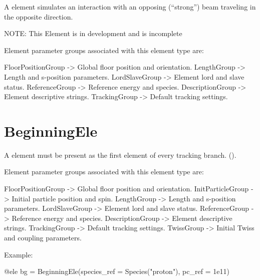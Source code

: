 A  element simulates an interaction with an opposing
(``strong'') beam traveling in the opposite direction.

NOTE: This Element is in development and is incomplete

Element parameter groups associated with this element type are:
\TOPrule
\begin{example}
  FloorPositionGroup -> Global floor position and orientation.  
  LengthGroup        -> Length and s-position parameters.  
  LordSlaveGroup     -> Element lord and slave status.  
  ReferenceGroup     -> Reference energy and species.  
  DescriptionGroup   -> Element descriptive strings.  
  TrackingGroup      -> Default tracking settings.  
\end{example}
\BOTTOMrule


\newpage

\section{BeginningEle}
\label{s:begin.ele}

A  element must be present as the first element of every tracking branch.
().

Element parameter groups associated with this element type are:
\TOPrule
\begin{example}
  FloorPositionGroup -> Global floor position and orientation.  
  InitParticleGroup  -> Initial particle position and spin.  
  LengthGroup        -> Length and s-position parameters.  
  LordSlaveGroup     -> Element lord and slave status.  
  ReferenceGroup     -> Reference energy and species.  
  DescriptionGroup   -> Element descriptive strings.  
  TrackingGroup      -> Default tracking settings.  
  TwissGroup         -> Initial Twiss and coupling parameters.  
\end{example}
\BOTTOMrule


Example:
\begin{example}
  @ele bg = BeginningEle(species_ref = Species("proton"), pc_ref = 1e11)
\end{example}

